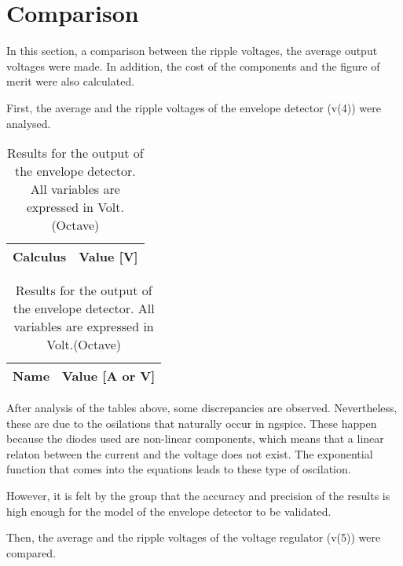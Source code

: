 \section{Comparison}\label{section:comparison}

In this section, a comparison between the ripple voltages, the average output voltages were made. In addition, the cost of the components and the figure of merit were also calculated.

First, the average and the ripple voltages of the envelope detector (v(4)) were analysed.

\begin{table}[ht]
\parbox{.45\linewidth}{
  \centering
  \begin{tabular}{|l|r|}
    \hline    
    {\bf Calculus} & {\bf Value [V]} \\ \hline
    
  \end{tabular}
  \caption{Results for the output of the envelope detector. All variables are expressed in Volt. (Ngspice)}} 
\parbox{.45\linewidth}{
 \centering
  \begin{tabular}{|l|r|}
    \hline    
    {\bf Name} & {\bf Value [A or V]} \\ \hline
    
  \end{tabular}
  \caption{Results for the output of the envelope detector. All variables are expressed in Volt.(Octave)}}
 
\end{table}

\par After analysis of the tables above, some discrepancies are observed. Nevertheless, these are due to the osilations that naturally occur in ngspice. These happen because the diodes used are non-linear components, which means that a linear relaton between the current and the voltage does not exist. The exponential function that comes into the equations leads to these type of oscilation. 

\par However, it is felt by the group that the accuracy and precision of the results is high enough for the model of the envelope detector to be validated. 



\par Then, the average and the ripple voltages of the voltage regulator (v(5)) were compared.


